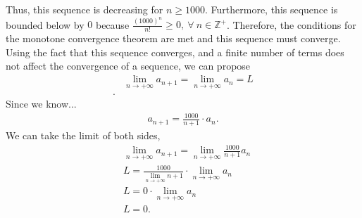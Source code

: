 \documentclass{report}
\begin{document}
    \bigbreak \noindent 
    Thus, this sequence is decreasing for $n \geq 1000$. Furthermore, this sequence is bounded below by $0$ because $\frac{(1000)^{n}}{n!} \geq 0,\  \forall\ n \in \mathbb{Z^{+}}$. Therefore, the conditions for the monotone convergence theorem are met and this sequence must converge.
    \bigbreak \noindent 
    Using the fact that this sequence converges, and a finite number of terms does not affect the convergence of a sequence, we can propose
    \begin{align*}
        &\lim\limits_{n \to +\infty}{a_{n+1}} = \lim\limits_{n \to +\infty}{a_{n}} = L  \\
    .\end{align*}
    \bigbreak \noindent 
    Since we know...
    \begin{align*}
        a_{n+1} = \frac{1000}{n+1}\cdot a_{n} 
    .\end{align*}
    We can take the limit of both sides, 
    \begin{align*}
        &\lim\limits_{n \to +\infty}{a_{n+1}} = \lim\limits_{n \to +\infty}{\frac{1000}{n+1}a_{n}} \\
        &L = \frac{1000}{\lim\limits_{n \to +\infty}{n+1}}\cdot \lim\limits_{n \to +\infty}{a_{n}} \\
        &L = 0 \cdot \lim\limits_{n \to +\infty}{a_{n}} \\
        &L = 0
    .\end{align*}
    



    
    



    
    
\end{document}
